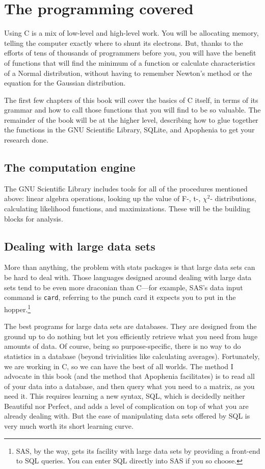 \documentclass[12pt,notitlepage, openany]{book}
\def\ind#1{\index{#1}#1}
\begin{document}
\section{The programming covered}

Using C is a mix of low-level and high-level
work. You will be allocating memory, telling the computer exactly where
to shunt its electrons. But, thanks to the efforts of tens of thousands
of programmers before you, you will have the benefit of functions that
will find the minimum of a function or calculate characteristics of a
Normal distribution, without having to remember Newton's method or
the equation for the Gaussian distribution.

The first few chapters of this book will cover the basics of C itself,
in terms of its grammar and how to call those functions that
you will find to be so valuable. The remainder of the book will be at the higher
level, describing how to glue together the functions in the
GNU Scientific Library, SQLite, and Apophenia to get your research done.

\subsection{The computation engine} The \ind{GNU Scientific Library} includes tools for
all of the procedures mentioned above: linear algebra operations, looking up the
value of F-, t-, $\chi^2$- distributions, calculating likelihood functions, and
maximizations. These will be the building blocks for analysis.

\subsection{Dealing with large data sets} More than anything, the problem
with stats packages is that large data sets can be hard to deal
with. Those languages designed around dealing with large data
sets tend to be even more draconian than C---for example, SAS's data
input command is {\tt card}, referring to the punch card it expects you
to put in the hopper.\footnote{SAS, by the way, gets its facility with large data sets
by providing a front-end to SQL queries. You can enter SQL directly into
SAS if you so choose.}

The best programs for large data sets are \ind{databases}. They are
designed from the ground up to do nothing but let you efficiently
retrieve what you need from huge amounts of data.  Of course, being so
purpose-specific, there is no way to do statistics in a database (beyond
trivialities like calculating averages). Fortunately, we are working in
C, so we can have the best of all worlds. The method I advocate in this
book (and the method that Apophenia facilitates) is to read all of your
data into a database, and then query what you need to a matrix, as you
need it. This requires learning a new syntax, \ind{SQL}, which is decidedly
neither Beautiful nor Perfect, and adds a level of complication on top
of what you are already dealing with. But the ease of manipulating data
sets offered by SQL is very much worth its short learning curve.
\end{document}

